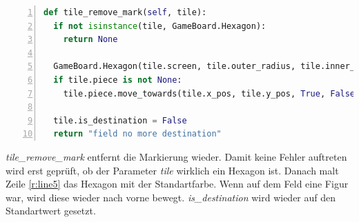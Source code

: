 \begin{lstlisting}[language=python,caption={Felder markieren},captionpos=b,label={lst:hexa:markieren},numbers=left,frame=none,escapechar=|]
def tile_remove_mark(self, tile):
  if not isinstance(tile, GameBoard.Hexagon):
    return None

  GameBoard.Hexagon(tile.screen, tile.outer_radius, tile.inner_radius,tile.x_pos, tile.y_pos)|\label{r:line5}|
  if tile.piece is not None:
    tile.piece.move_towards(tile.x_pos, tile.y_pos, True, False)

  tile.is_destination = False
  return "field no more destination"

\end{lstlisting}

\textit{tile\_remove\_mark} entfernt die Markierung wieder. Damit keine Fehler auftreten wird erst geprüft, ob der Parameter \textit{tile} wirklich ein Hexagon ist. Danach malt Zeile \ref{r:line5} das Hexagon mit der Standartfarbe. Wenn auf dem Feld eine Figur war, wird diese wieder nach vorne bewegt. \textit{is\_destination} wird wieder auf den Standartwert gesetzt.
